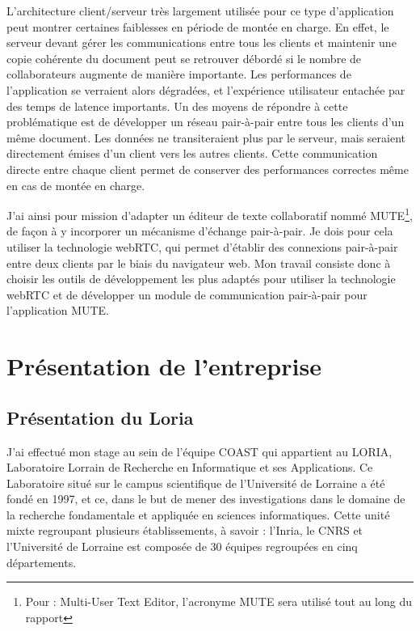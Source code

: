 \documentclass{tnreport}
\begin{document}
L'architecture client/serveur très largement utilisée pour ce type d'application peut montrer certaines faiblesses en période de 
montée en charge. En effet, le serveur devant gérer les communications entre tous les clients et maintenir une copie cohérente du 
document peut se retrouver débordé si le nombre de collaborateurs augmente de manière importante. Les performances de l'application se 
verraient alors dégradées, et l'expérience utilisateur entachée par des temps de latence importants. Un des moyens de répondre à cette 
problématique est de développer un réseau pair-à-pair entre tous les clients d'un même document. Les données ne transiteraient plus 
par le serveur, mais seraient directement émises d'un client vers les autres clients. Cette communication directe entre chaque client 
permet de conserver des performances correctes même en cas de montée en charge. 

J'ai ainsi pour mission d'adapter un éditeur de texte collaboratif nommé MUTE\footnote{Pour : Multi-User Text Editor, l'acronyme MUTE sera utilisé tout au long du rapport}, de façon à y incorporer un mécanisme d'échange pair-à-pair. Je dois pour cela utiliser la technologie webRTC, qui permet d'établir des connexions pair-à-pair entre deux clients par le biais du navigateur web. Mon travail consiste donc à choisir les outils de développement les 
plus adaptés pour utiliser la technologie webRTC et de développer un module de communication pair-à-pair pour l'application MUTE. 


\cleardoublepage

\chapter{Présentation de l'entreprise}

\section{Présentation du Loria}

J'ai effectué mon stage au sein de l'équipe COAST qui appartient au LORIA, Laboratoire Lorrain de Recherche en Informatique et ses Applications. 
Ce Laboratoire situé sur le campus scientifique de l'Université de Lorraine a été fondé en 1997, et ce, dans le but 
de mener des investigations dans le domaine de la recherche fondamentale et appliquée en sciences informatiques. 
Cette unité mixte regroupant plusieurs établissements, à savoir : l'Inria, le CNRS et l'Université de Lorraine est composée 
de 30 équipes regroupées en cinq départements.
\end{document}
